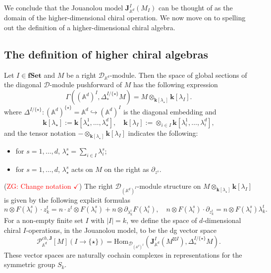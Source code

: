 \documentclass[11pt]{amsart}
\theoremstyle{definition}
\theoremstyle{remark}
\numberwithin{equation}{section}
\newcommand{\kk}{\mathbf{k}}
\newcommand{\Gui}[1]{(\textcolor{red}{ZG: #1})}
\begin{document}
    We conclude that the Jouanolou model $\mathbf{J}_{\mathbb{A}^d}^{{I}}(M_{{I}})$ can be thought of as the domain of the higher-dimensional chiral operation.
    We now move on to spelling out the definition of a higher-dimensional chiral algebra.

    \subsection{The definition of higher chiral algebras}

Let ${I}\in {\mathbf{fSet}}$ and $M$ be a right $\mathcal{D}_{\mathbb{A}^d}$-module. Then the space of global sections
of the diagonal $\mathcal{D}$-module pushforward of $M$ has the following expression
$$
\Gamma\left((\mathbb{A}^d)^{{I}},\Delta^{I/\{\star\}} _*M\right)=M\otimes_{\kk[\lambda_{\star}]}\kk[\lambda_I].
$$
where $\Delta^{I/\{\star\}} \colon (\mathbb{A}^d)^{\{\star\}} = \mathbb{A}^d \hookrightarrow(\mathbb{A}^d)^{I}$ is the diagonal
embedding and
$$
\kk[\lambda_{\star}]:=\kk[\lambda^1_{\star},\dots,\lambda^d_{\star}], \quad \kk[\lambda_{I}]:=\otimes_{{i\in I}}\kk[\lambda^1_{i},\dots,\lambda^d_{i}],
$$
and the tensor notation $-\otimes_{\kk[\lambda_{\star}]}\kk[\lambda_I]$ indicates the following:
\begin{itemize}
  \item for $s=1,\dots,d$, $\lambda^s_{\star}=\sum\limits_{i\in I}\lambda^s_i$;
  \item for $s=1,\dots,d$, $\lambda^s_{\star}$ acts on $M$ on the right as $\partial_{z^s}$.
\end{itemize}
\Gui{Change notation $\checkmark$}
The right $\mathcal{D}_{(\mathbb{A}^d)^{{I}}}$-module structure on $M\otimes_{\kk[\lambda_{\star}]}\kk[\lambda_I]$ is given by the following explicit formulas
$$
n\otimes F(\lambda^s_i)\cdot z^t_k=n \cdot z^t\otimes F(\lambda^s_i)+n\otimes \partial_{\lambda^t_k}F(\lambda^s_i),\quad n\otimes F(\lambda^s_i)\cdot \partial_{z^t_k}=n\otimes F(\lambda^s_i)\lambda^t_k.
$$
For a non-empty finite set $I$ with $|I|=k$, we define the space of $d$-dimensional chiral $I$-operations, in the Jouanolou model,
to be the dg vector space
$$
\mathcal{P}^{ch,\mathbf{J}}_{\mathbb{A}^d}[M](I\rightarrow \{\star\})=\mathrm{Hom}_{\mathcal{D}_{(\mathbb{A}^d)^{I}}}\left(\mathbf{J}_{\mathbb{A}^d}^{I}(M^{\boxtimes I}),\Delta^{I/\{\star\}}_*M\right).
$$
These vector spaces are naturally cochain complexes in representations for the symmetric group $S_k$.
\end{document}
